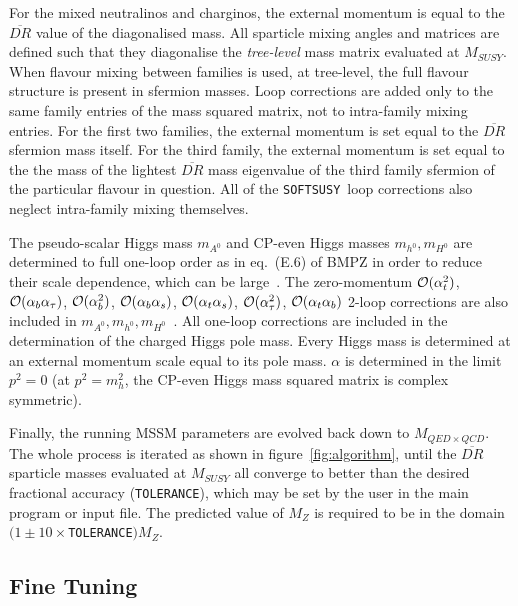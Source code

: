 \documentclass{article}
\def\at{\alpha_t}
\def\ab{\alpha_b}
\def\as{\alpha_s}
\def\atau{\alpha_{\tau}}
\def\oatab{{\cal O}(\at\ab)}
\def\oatas{{\cal O}(\at\as)}
\def\oabas{{\cal O}(\ab\as)}
\def\oatq{{\cal O}(\at^2)}
\def\oabq{{\cal O}(\ab^2)}
\def\oatauq{{\cal O}(\atau^2)}
\def\oabatau{{\cal O}(\ab \atau)}
\def\SOFTSUSY{{\tt SOFTSUSY}}
\def\code#1{\small{\tt #1}\normalsize}
\begin{document}
For the mixed neutralinos and charginos, the
external momentum is equal to the $\overline{DR}$ value of the diagonalised
mass.
All sparticle mixing angles and matrices are defined such that they diagonalise
the {\em tree-level} mass matrix evaluated at $M_{SUSY}$. 
When flavour mixing between families is used, at
tree-level, the full flavour structure is present in sfermion masses.
Loop corrections are added only to the same family entries of the mass squared
matrix, not to
intra-family mixing entries. For the first two families, 
the external momentum is set equal to the $\overline{DR}$ sfermion mass
itself. For the third 
family, the external momentum is set equal to the the mass of the lightest
$\overline{DR}$ mass eigenvalue of the third family sfermion of the particular
flavour in question. 
All of the \SOFTSUSY~loop
corrections also neglect intra-family mixing themselves.

The pseudo-scalar Higgs  mass $m_{A^0}$ and CP-even Higgs masses $m_{h^0},
m_{H^0}$ are determined to full one-loop order
as in eq.~(E.6) of BMPZ in order to reduce
their scale dependence, which can be large~\cite{Katsikatsou:2000cd}. 
The zero-momentum $\oatq$, $\oabatau$, $\oabq$, $\oabas$, $\oatas$, $\oatauq$,
$\oatab$
2-loop corrections are 
also included in $m_{A^0}, m_{h^0},
m_{H^0}$~\cite{Degrassi:2001yf,Brignole:2001jy,Brignole:2002bz,Dedes:2003km}.
All one-loop corrections are included in
the determination of the charged Higgs pole mass.
Every Higgs mass is determined at an external momentum scale equal to its
pole mass. $\alpha$ is determined in the limit $p^2=0$ (at $p^2=m_h^2$, the
CP-even Higgs mass squared matrix is complex symmetric).

Finally, the running MSSM parameters are evolved back down to $M_{QED \times QCD}$.
The whole process is iterated as shown in figure~\ref{fig:algorithm}, until the
$\overline{DR}$ sparticle masses evaluated at $M_{SUSY}$
all converge to better than the desired fractional accuracy
(\code{TOLERANCE}), which may be set by the user in the main program or input
file. The predicted value of $M_Z$ is required to be in the domain
$(1\pm10\times$\code{TOLERANCE}$)M_Z$.

\subsection{Fine Tuning \label{sec:finetune}}
\end{document}
